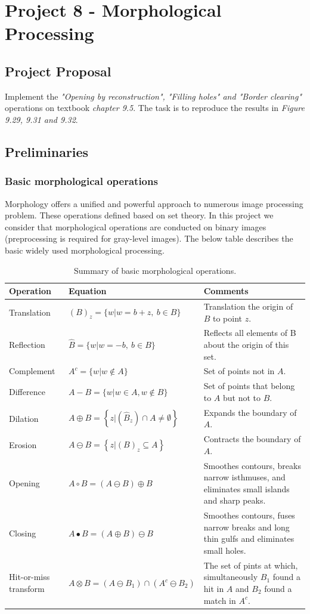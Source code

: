 
\section{Project 8 - Morphological Processing}

\subsection{Project Proposal}
Implement the \emph{"Opening by reconstruction", "Filling holes" and "Border clearing"} operations on textbook \emph{chapter 9.5}. The task is to reproduce the results in \emph{Figure 9.29, 9.31 and 9.32}.

\subsection{Preliminaries}
\subsubsection{Basic morphological operations}
Morphology offers a unified and powerful approach to numerous image processing problem. These operations defined based on set theory. In this project we consider that morphological operations are conducted on binary images (preprocessing is required for gray-level images). The below table describes the basic widely used morphological processing.
\begin{table}[h]
	\caption{Summary of basic morphological operations.}
	\centering
	\begin{tabular}{|l|l|m{}|}\hline
		Operation & Equation & Comments\\ \hline
		Translation & $(B)_z=\{w|w=b+z, ~ b \in B \}$ & Translation the origin of $B$ to point $z$.\\
		Reflection & $\hat{B}=\{w|w=-b, ~ b \in B\}$ & Reflects all elements of B about the origin of this set.\\
		Complement & $A^c=\{ w|w \notin A \}$ & Set of points not in $A$.\\
		Difference & $A-B=\{ w|w \in A, w \notin B\}$ & Set of points that belong to $A$ but not to $B$.\\
		Dilation & $A \oplus B=\left\{ z|(\hat{B}_z) \cap A \neq \emptyset \right\}$ & Expands the boundary of $A$.\\
		Erosion & $A \ominus B=\left\{ z|(B)_z \subseteq A \right\}$ & Contracts the boundary of $A$.\\
		Opening & $A \circ B=(A\ominus B)\oplus B $ & Smoothes contours, breaks narrow isthmuses, and eliminates small islands and sharp peaks.\\
		Closing & $A \bullet B=(A\oplus B)\ominus B $ & Smoothes contours, fuses narrow breaks and long thin gulfs and eliminates small holes.\\
		Hit-or-miss transform & $A \otimes B=(A\ominus B_1)\cap(A^c\ominus B_2)$ & The set of pints at which, simultaneously $B_1$ found a hit in $A$ and $B_2$ found a match in $A^c$.\\ \hline
	\end{tabular}
\end{table}

